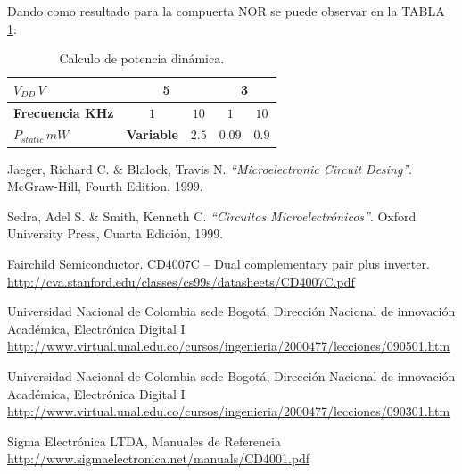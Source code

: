 \documentclass[twocolumn]{IEEEtran}
\begin{document}
\noindent
Dando como resultado para la compuerta NOR se puede observar en la TABLA \ref{tab10}:
\begin{table}[H]
  \caption{Calculo de potencia dinámica.}
    \begin{tabular}{|l|c|c|c|c|}\hline
      $V_{DD}\, V$ & \multicolumn{2}{c|}{\textbf{5}}  & \multicolumn{2}{c|}{\textbf{3}} \\ \hline
      \textbf{Frecuencia KHz} & $1$ & $10$ & $1$ & $10$ \\ \hline
      $P_{static}\,mW$ & \textbf{Variable} & $2.5$ & $0.09$ & $0.9$ \\ \hline
    \end{tabular}
  \label{tab10}
\end{table}


\begin{thebibliography}{99}
   
   Jaeger, Richard C. \& Blalock, Travis N.
  {\em "`Microelectronic Circuit Desing"'}.
  McGraw-Hill, Fourth Edition, 1999.
  
   Sedra, Adel S. \& Smith, Kenneth C.
  {\em "`Circuitos Microelectrónicos"'}.
  Oxford University Press, Cuarta Edición, 1999.
   
   Fairchild Semiconductor. CD4007C -- Dual complementary pair plus inverter. \url{http://cva.stanford.edu/classes/cs99s/datasheets/CD4007C.pdf}
   
   Universidad Nacional de Colombia sede Bogotá, Dirección Nacional de innovación Académica, Electrónica Digital I   \url{http://www.virtual.unal.edu.co/cursos/ingenieria/2000477/lecciones/090501.htm}

   Universidad Nacional de Colombia sede Bogotá, Dirección Nacional de innovación Académica, Electrónica Digital I   \url{http://www.virtual.unal.edu.co/cursos/ingenieria/2000477/lecciones/090301.htm}
  
   Sigma Electrónica LTDA, Manuales de Referencia \url{http://www.sigmaelectronica.net/manuals/CD4001.pdf}
  
\end{thebibliography}
\end{document}
